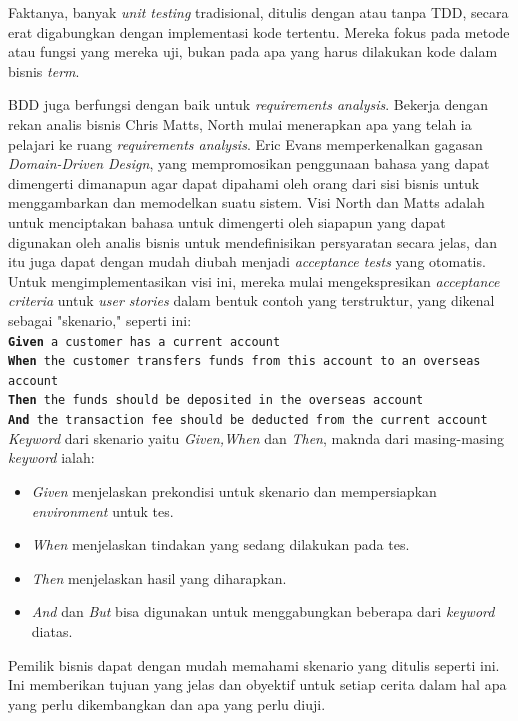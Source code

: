 \documentclass[a4paper,twoside]{article}
\begin{document}
\begin{enumerate}
Faktanya, banyak \textit{unit testing} tradisional, ditulis dengan atau tanpa TDD, secara erat digabungkan dengan implementasi kode tertentu. Mereka fokus pada metode atau fungsi yang mereka uji, bukan pada apa yang harus dilakukan kode dalam  bisnis \textit{term}.

BDD juga berfungsi dengan baik untuk \textit{requirements analysis}. Bekerja dengan rekan analis bisnis Chris Matts, North mulai menerapkan apa yang telah ia pelajari ke ruang \textit{requirements analysis}. Eric Evans memperkenalkan gagasan \textit{Domain-Driven Design}, yang mempromosikan penggunaan bahasa yang dapat dimengerti dimanapun agar dapat dipahami oleh  orang dari sisi bisnis untuk menggambarkan dan memodelkan suatu sistem. Visi North dan Matts adalah untuk menciptakan bahasa untuk dimengerti oleh siapapun yang dapat digunakan oleh analis bisnis untuk mendefinisikan persyaratan secara jelas, dan itu juga dapat dengan mudah diubah menjadi \textit{acceptance tests} yang otomatis. Untuk mengimplementasikan visi ini, mereka mulai mengekspresikan \textit{acceptance criteria} untuk \textit{user stories} dalam bentuk contoh yang terstruktur, yang dikenal sebagai "skenario," seperti ini:\\
\texttt{\textbf{Given} a customer has a current account \\
\textbf{When} the customer transfers funds from this account to an overseas account\\
\textbf{Then} the funds should be deposited in the overseas account\\
\textbf{And} the transaction fee should be deducted from the current account\\}
\textit{Keyword} dari skenario yaitu \textit{Given,When} dan \textit{Then}, maknda dari masing-masing \textit{keyword} ialah: 
\begin{itemize}
 \item \textit{Given} menjelaskan prekondisi untuk skenario dan mempersiapkan \textit{environment} untuk tes.
 \item \textit{When} menjelaskan tindakan yang sedang dilakukan pada tes.
 \item \textit{Then} menjelaskan hasil yang diharapkan.
 \item \textit{And} dan \textit{But} bisa digunakan untuk menggabungkan beberapa dari \textit{keyword} diatas.
\end{itemize}

Pemilik bisnis dapat dengan mudah memahami skenario yang ditulis seperti ini. Ini memberikan tujuan yang jelas dan obyektif untuk setiap cerita dalam hal apa yang perlu dikembangkan dan apa yang perlu diuji.


\end{enumerate}
\end{document}
